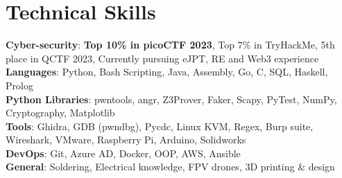 \section{Technical Skills}

\begin{itemize}[leftmargin=0.15in, label={}]
    \small{\item{
        \textbf{Cyber-security}{: \textbf{Top 10\% in picoCTF 2023}, Top 7\% in TryHackMe, 5th place in QCTF 2023, Currently pursuing eJPT, RE and Web3 experience} \\ \vspace{1.5mm}
        \textbf{Languages}{: Python, Bash Scripting, Java, Assembly, Go, C, SQL, Haskell, Prolog} \\ \vspace{1.5mm}
        \textbf{Python Libraries}{: pwntools, angr, Z3Prover, Faker, Scapy, PyTest, NumPy, Cryptography, Matplotlib} \\ \vspace{1.5mm}
        \textbf{Tools}{: Ghidra, GDB (pwndbg), Pycdc, Linux KVM, Regex, Burp suite, Wireshark, VMware, Raspberry Pi, Arduino, Solidworks} \\ \vspace{1.5mm}
        \textbf{DevOps}{: Git, Azure AD, Docker, OOP, AWS, Ansible}\\ \vspace{1.5mm}
        \textbf{General}{: Soldering, Electrical knowledge, FPV drones, 3D printing \& design}\\
    }}
\end{itemize}